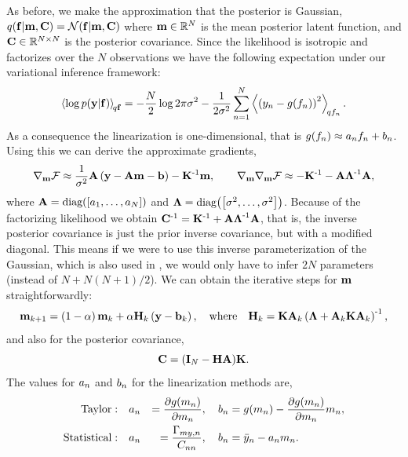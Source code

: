 \documentclass{article} %
\begin{document}
As before, we make the approximation that the posterior is Gaussian,
$\qrobC{\lstate}{\pomean, \pocov} = \gausC{\lstate}{\pomean, \pocov}$ where
$\pomean \in \real{N}$ is the mean posterior latent function, and $\pocov \in
\real{N \times N}$ is the posterior covariance. Since the likelihood is
isotropic and factorizes over the $N$  observations 
we have the following expectation under
our variational inference framework:
\begin{equation*}
    \expec{q\lstate}{\log\probC{\obs}{\lstate}} =
        - \frac{N}{2}\log{2\pi\lvar}
        - \frac{1}{2\lvar} \sum_{n=1}^N 
            \expec{q\lstates_n}{\brac{\obss_n - \nonlin{\lstates_n}}^2}.
\end{equation*}
As a consequence the linearization is one-dimensional, that is
$\nonlin{\lstates_n} \approx \Lins_n\lstates_n + \intcpts_n$.  Using this we
can derive the approximate gradients,
\begin{equation}
    \nabla_\pomean\Fengy \approx \frac{1}{\lvar}\Linmat\brac{\obs -
        \Linmat\pomean - \intcpt} - \KERNL\inv\pomean,
    \qquad
    \nabla_\pomean\nabla_\pomean \Fengy \approx -\KERNL\inv
    -\Linmat\Lvar\inv\Linmat,
\end{equation}
where $\Linmat = \diag{\sbrac{\Lins_1, \ldots, \Lins_N}}$ and $\Lvar =
\diag{\sbrac{\lvar, \ldots, \lvar}}$. Because of the factorizing likelihood we
obtain $\pocov\inv = \KERNL\inv + \Linmat\Lvar\inv\Linmat$, that is, the
inverse posterior covariance is just the prior inverse covariance, but with a
modified diagonal. This means if we were to use this inverse parameterization
of the Gaussian, which is also used in \cite{Opper2009}, we would only have to
infer $2N$ parameters (instead of $N + N(N+1)/2$). We can obtain the iterative
steps for $\pomean$ straightforwardly:
\begin{equation}
    \pomean_{k+1} = \brac{1-\step}\pomean_k 
        + \step\Kgain_k\brac{\obs - \intcpt_k}, 
        \quad \text{where} \quad
    \Kgain_k = \KERNL\Linmat_k\brac{\Lvar + \Linmat_k\KERNL\Linmat_k}\inv,
    \label{eq:pomeangp}
\end{equation}
and also for the posterior covariance,
\begin{equation}
    \pocov = \brac{\ident{N} - \Kgain\Linmat}\!\KERNL.
    \label{eq:pocovgp}
\end{equation}
The values for $\Lins_n$ and $\intcpts_n$ for the linearization methods are,
\begin{alignat}{3}
    \text{Taylor}:&\quad
        \Lins_n &= \frac{\partial\nonlin{\pomeans_n}}{\partial\pomeans_n},
        \quad
        \intcpts_n &= \nonlin{\pomeans_n}
        - \frac{\partial\nonlin{\pomeans_n}}{\partial\pomeans_n} \pomeans_n, \\
    \text{Statistical}:&\quad
        \Lins_n &= \frac{\xcovs_{\pomeans\obss,n}}{\pocovs_{nn}},
        \quad
        \intcpts_n &= \bar\obss_n - \Lins_n\pomeans_n.
\end{alignat}
\end{document}
